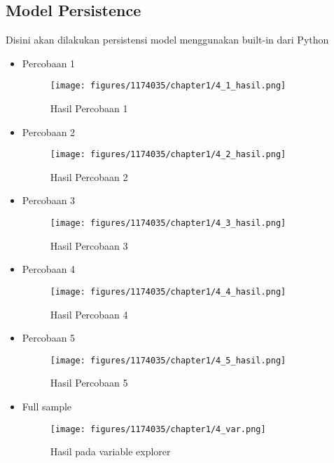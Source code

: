 \subsection{Model Persistence}
Disini akan dilakukan persistensi model menggunakan built-in dari Python
\begin{itemize}
	\item Percobaan 1  \hfill \break 
	\begin{figure}[H]
		\texttt{[image: figures/1174035/chapter1/4\_1\_hasil.png]}
		\centering
		\caption{Hasil Percobaan 1}
	\end{figure}
	\item Percobaan 2 \hfill \break 
	\begin{figure}[H]
		\texttt{[image: figures/1174035/chapter1/4\_2\_hasil.png]}
		\centering
		\caption{Hasil Percobaan 2}
	\end{figure}
	\item Percobaan 3  \hfill \break 
	\begin{figure}[H]
		\texttt{[image: figures/1174035/chapter1/4\_3\_hasil.png]}
		\centering
		\caption{Hasil Percobaan 3}
	\end{figure}
	\item Percobaan 4  \hfill \break 
	\begin{figure}[H]
		\texttt{[image: figures/1174035/chapter1/4\_4\_hasil.png]}
		\centering
		\caption{Hasil Percobaan 4}
	\end{figure}
	\item Percobaan 5  \hfill \break 
	\begin{figure}[H]
		\texttt{[image: figures/1174035/chapter1/4\_5\_hasil.png]}
		\centering
		\caption{Hasil Percobaan 5}
	\end{figure}
	\item Full sample \hfill \break 
	\begin{figure}[H]
		\texttt{[image: figures/1174035/chapter1/4\_var.png]}
		\centering
		\caption{Hasil pada variable explorer}
	\end{figure}
\end{itemize}
